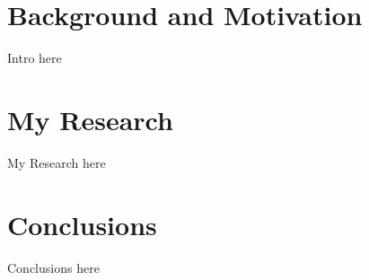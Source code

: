 \documentclass{beamer}
\begin{document}
{

}


\section{Background and Motivation}

\begin{frame}
  Intro here
\end{frame}

\section{My Research}

\begin{frame}
  My Research here
\end{frame}

\section{Conclusions}

\begin{frame}
  Conclusions here 
\end{frame}
\end{document}
